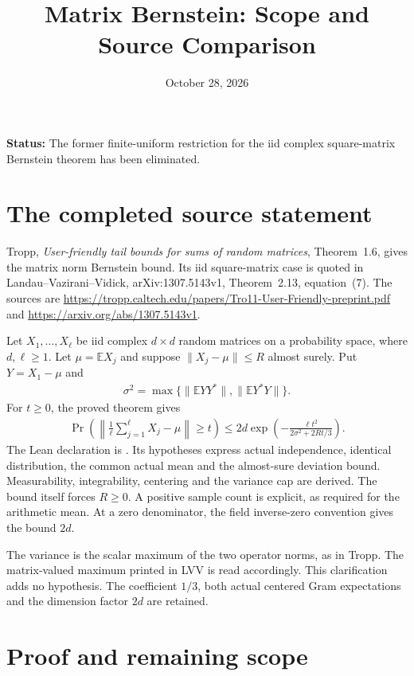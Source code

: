 \documentclass{article}
\title{Matrix Bernstein: Scope and Source Comparison}
\author{}
\date{October 28, 2026}
\begin{document}
\maketitle

\noindent\textbf{Status:} The former finite-uniform restriction for the iid
complex square-matrix Bernstein theorem has been eliminated.

\section{The completed source statement}

Tropp, \emph{User-friendly tail bounds for sums of random matrices},
Theorem~1.6, gives the matrix norm Bernstein bound. Its iid square-matrix case
is quoted in Landau--Vazirani--Vidick, %
arXiv:1307.5143v1, Theorem~2.13, equation~(7). The sources are
\url{https://tropp.caltech.edu/papers/Tro11-User-Friendly-preprint.pdf} and
\url{https://arxiv.org/abs/1307.5143v1}.

Let $X_1,\ldots,X_\ell$ be iid complex $d\times d$ random matrices on a
probability space, where $d,\ell\ge1$. Let $\mu=\mathbb EX_j$ and suppose
$\|X_j-\mu\|\le R$ almost surely. Put $Y=X_1-\mu$ and
\begin{align*}
    \sigma^2=\max\{\|\mathbb EYY^*\|,\|\mathbb EY^*Y\|\}.
\end{align*}
For $t\ge0$, the proved theorem gives
\begin{align*}
    \Pr\left(\left\|\frac1\ell\sum_{j=1}^{\ell}X_j-\mu\right\|\ge t\right)
    \le2d\exp\left(-\frac{\ell t^2}{2\sigma^2+2Rt/3}\right).
\end{align*}
The Lean declaration is .
Its hypotheses express actual independence, identical distribution, the common
actual mean and the almost-sure deviation bound. Measurability, integrability,
centering and the variance cap are derived. The bound itself forces $R\ge0$.
A positive sample count is explicit, as required for the arithmetic mean.
At a zero denominator, the field inverse-zero convention gives the bound $2d$.

The variance is the scalar maximum of the two operator norms, as in Tropp.
The matrix-valued maximum printed in LVV is read accordingly. This clarification
adds no hypothesis. The coefficient $1/3$, both actual centered Gram expectations
and the dimension factor $2d$ are retained.

\section{Proof and remaining scope}
\end{document}
